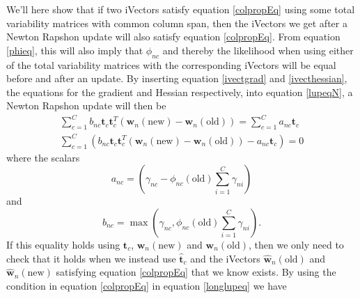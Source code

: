 We'll here show that if two iVectors satisfy equation \ref{colpropEq} using some total variability matrices with common column span, then the iVectors we get after a Newton Rapshon update will also satisfy equation \ref{colpropEq}. From equation \ref{phieq}, this will also imply that $\phi_{nc}$ and thereby the likelihood when using either of the total variability matrices with the corresponding iVectors will be equal before and after an update. By inserting equation \ref{ivectgrad} and \ref{ivecthessian}, the equations for the gradient and Hessian respectively, into equation \ref{lupeqN}, a Newton Rapshon update will then be
\begin{align}
\sum_{c=1}^C b_{nc} \mathbf{t}_c \mathbf{t}_c^T(\mathbf{w}_n(\text{new})-\mathbf{w}_n(\text{old})) = \sum_{c=1}^C a_{nc} \mathbf{t}_c \nonumber \\
\sum_{c=1}^C \left(b_{nc} \mathbf{t}_c \mathbf{t}_c^T(\mathbf{w}_n(\text{new})-\mathbf{w}_n(\text{old})) - a_{nc} \mathbf{t}_c\right) = 0 \label{longlupeq}
\end{align}
where the scalars
\begin{equation*}
a_{nc} = \left(\gamma_{nc}-\phi_{nc}(\text{old})\sum_{i=1}^C \gamma_{ni} \right)
\end{equation*}
and
\begin{equation*}
b_{nc} = \max\left(\gamma_{nc}, \phi_{nc}(\text{old})\sum_{i=1}^C \gamma_{ni} \right).
\end{equation*}
If this equality holds using $\mathbf{t}_c$, $\mathbf{w}_n(\text{new})$ and $\mathbf{w}_n(\text{old})$, then we only need to check that it holds when we instead use $\mathbf{\hat{t}}_c$ and the iVectors $\mathbf{\hat{w}}_n(\text{old})$ and $\mathbf{\hat{w}}_n(\text{new})$ satisfying equation \ref{colpropEq} that we know exists. By using the condition in equation \ref{colpropEq} in equation \ref{longlupeq} we have

